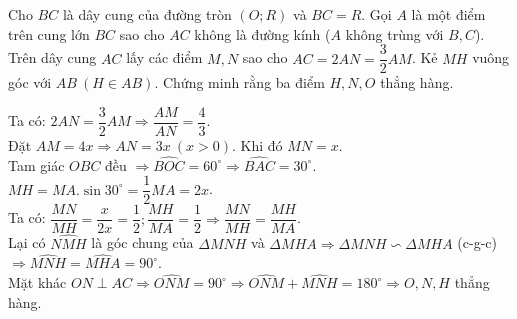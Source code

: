 \begin{ex}%
	Cho $BC$ là dây cung của đường tròn $(O;R)$ và $BC=R$. Gọi $A$ là một điểm trên cung lớn $BC$ sao cho $AC$ không là đường kính ($A$ không trùng với $B,C$). Trên dây cung $AC$ lấy các điểm $M,N$ sao cho $AC=2AN=\dfrac{3}{2}AM$. Kẻ $MH$ vuông góc với $AB\ (H\in AB)$. Chứng minh rằng ba điểm $H,N,O$ thẳng hàng.
\loigiai
    {
    \begin{center}
\end{center}
Ta có: $2AN=\dfrac{3}{2}AM\Rightarrow \dfrac{AM}{AN}=\dfrac{4}{3}$.\\
    Đặt $AM=4x\Rightarrow AN=3x\ (x>0)$. Khi đó $MN=x$.\\
    Tam giác $OBC$ đều $\Rightarrow \widehat{BOC}=60^\circ\Rightarrow \widehat{BAC}=30^\circ$.\\
    $MH=MA.\sin 30^\circ=\dfrac{1}{2}MA=2x$.\\
    Ta có: $\dfrac{MN}{MH}=\dfrac{x}{2x}=\dfrac{1}{2}; \dfrac{MH}{MA}=\dfrac{1}{2}\Rightarrow \dfrac{MN}{MH}=\dfrac{MH}{MA}$.\\
    Lại có $\widehat{NMH}$ là góc chung của $\Delta MNH$ và $\Delta MHA\Rightarrow \Delta MNH\backsim\Delta MHA$ (c-g-c)\\ $\Rightarrow \widehat{MNH}=\widehat{MHA}=90^\circ$.\\
    Mặt khác $ON\perp AC\Rightarrow \widehat{ONM}=90^\circ\Rightarrow \widehat{ONM}+\widehat{MNH}=180^\circ\Rightarrow O,N,H$ thẳng hàng.
    }
\end{ex}

